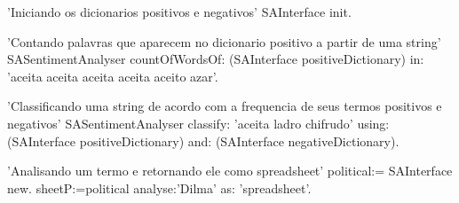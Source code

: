 \begin{godCode}
'Iniciando os dicionarios positivos e negativos'
SAInterface init.

'Contando palavras que aparecem no dicionario positivo a partir de uma string'
SASentimentAnalyser countOfWordsOf: (SAInterface positiveDictionary) in: 'aceita aceita aceita aceita aceito azar'.

'Classificando uma string de acordo com a frequencia de seus termos positivos e negativos'
SASentimentAnalyser classify: 'aceita ladro chifrudo' using: (SAInterface positiveDictionary) and: (SAInterface negativeDictionary).

'Analisando um termo e retornando ele como spreadsheet'
political:= SAInterface new.
sheetP:=political analyse:'Dilma' as: 'spreadsheet'.
\end{godCode}
